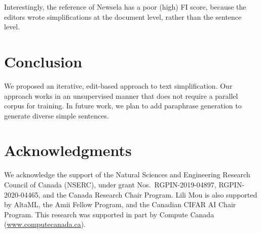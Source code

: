 \documentclass[11pt,a4paper]{article}
\begin{document}
Interestingly, the reference of Newsela has a poor (high) FI score, because the editors wrote simplifications at the document level, rather than the sentence level.

\begin{table}[t]
\centering
{}\caption{Human evaluation on Newsela, where we measure adequacy (A), simplicity (S), fluency (F), and their average score (Avg), based on 1--5 Likert scale. We also count average instances of false information per sentence (FI).}\vspace{-.2cm}
\end{table}



\section{Conclusion}

We proposed an iterative, edit-based approach to text simplification. Our approach works in an unsupervised manner that  does not require a parallel corpus for training. In future work, we plan to add paraphrase generation to generate diverse simple sentences.

\section*{Acknowledgments}

We acknowledge the support of the Natural Sciences and Engineering Research Council of Canada (NSERC), under grant Nos.~RGPIN-2019-04897, RGPIN-2020-04465, and the Canada Research Chair Program. 
Lili Mou is also supported by AltaML, the Amii
Fellow Program, and the Canadian CIFAR AI Chair Program. This research was supported in part by Compute Canada (\url{www.computecanada.ca}).




\end{document}
